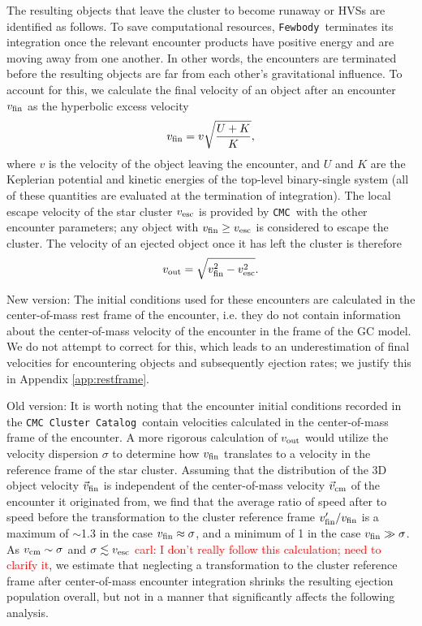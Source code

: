 \documentclass[twocolumn]{aastex631}
\newcommand{\CMC}{\texttt{CMC}}
\newcommand{\CMCcat}{\texttt{CMC Cluster Catalog}}
\newcommand{\fewbody}{\texttt{Fewbody}}
\newcommand{\carl}[1]{\textcolor{red}{carl: #1}}
\begin{document}
The resulting objects that leave the cluster to become runaway or HVSs are identified as follows.
To save computational resources, \fewbody\ terminates its integration once the relevant encounter products have positive energy and are moving away from one another.
In other words, the encounters are terminated before the resulting objects are far from each other's gravitational influence.
To account for this, we calculate the final velocity of an object after an encounter $v_{\rm fin}$ as the hyperbolic excess velocity
\begin{equation}
    v_{\rm fin} = v \sqrt{\frac{U + K}{K}},
\end{equation}
\noindent where $v$ is the velocity of the object leaving the encounter, and $U$ and $K$ are the Keplerian potential and kinetic energies of the top-level binary-single system (all of these quantities are evaluated at the termination of integration).
The local escape velocity of the star cluster $v_{\rm esc}$ is provided by \CMC\ with the other encounter parameters; any object with $v_{\rm fin} \ge v_{\rm esc}$ is considered to escape the cluster.
The velocity of an ejected object once it has left the cluster is therefore
\begin{equation}
    v_{\rm out} = \sqrt{v_{\rm fin}^2 - v_{\rm esc}^2}.
\end{equation}

{\color{blue} New version:
The initial conditions used for these encounters are calculated in the center-of-mass rest frame of the encounter, i.e. they do not contain information about the center-of-mass velocity of the encounter in the frame of the GC model.
We do not attempt to correct for this, which leads to an underestimation of final velocities for encountering objects and subsequently ejection rates; we justify this in Appendix \ref{app:restframe}.
}

{\color{magenta} Old version:
It is worth noting that the encounter initial conditions recorded in the \CMCcat\ contain velocities calculated in the center-of-mass frame of the encounter.
A more rigorous calculation of $v_{\rm out}$ would utilize the velocity dispersion $\sigma$ to determine how $v_{\rm fin}$ translates to a velocity in the reference frame of the star cluster.
Assuming that the distribution of the 3D object velocity $\vec{v}_{\rm fin}$ is independent of the center-of-mass velocity $\vec{v}_{\rm cm}$ of the encounter it originated from, we find that the average ratio of speed after to speed before the transformation to the cluster reference frame $v'_{\rm fin} / v_{\rm fin}$ is a maximum of $\sim$1.3 in the case $v_{\rm fin} \approx \sigma$, and a minimum of 1 in the case $v_{\rm fin} \gg \sigma$.
As $v_{\rm cm} \sim \sigma$ and $\sigma \lesssim v_{\rm esc}$ \carl{I don't really follow this calculation; need to clarify it}, we estimate that neglecting a transformation to the cluster reference frame after center-of-mass encounter integration shrinks the resulting ejection population overall, but not in a manner that significantly affects the following analysis.
}
\end{document}
